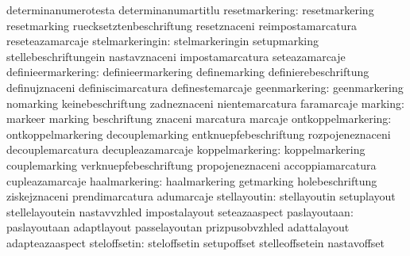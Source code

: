                                   determinanumerotesta             determinanumartitlu
                  resetmarkering: resetmarkering                   resetmarking
                                  ruecksetztenbeschriftung         resetznaceni
                                  reimpostamarcatura               reseteazamarcaje
                 stelmarkeringin: stelmarkeringin                  setupmarking
                                  stellebeschriftungein            nastavznaceni
                                  impostamarcatura                 seteazamarcaje
              definieermarkering: definieermarkering               definemarking
                                  definierebeschriftung            definujznaceni
                                  definiscimarcatura               definestemarcaje
                   geenmarkering: geenmarkering                    nomarking
                                  keinebeschriftung                zadneznaceni
                                  nientemarcatura                  faramarcaje
                         marking: markeer                          marking
                                  beschriftung                     znaceni
                                  marcatura                        marcaje
              ontkoppelmarkering: ontkoppelmarkering               decouplemarking
                                  entknuepfebeschriftung           rozpojeneznaceni
                                  decouplemarcatura                decupleazamarcaje %
                 koppelmarkering: koppelmarkering                  couplemarking
                                  verknuepfebeschriftung           propojeneznaceni
                                  accoppiamarcatura                cupleazamarcaje %
                   haalmarkering: haalmarkering                    getmarking
                                  holebeschriftung                 ziskejznaceni
                                  prendimarcatura                  adumarcaje %
                    stellayoutin: stellayoutin                     setuplayout
                                  stellelayoutein                  nastavvzhled
                                  impostalayout                    seteazaaspect
                    paslayoutaan: paslayoutaan                     adaptlayout
                                  passelayoutan                    prizpusobvzhled
                                  adattalayout                     adapteazaaspect
                    steloffsetin: steloffsetin                     setupoffset
                                  stelleoffsetein                  nastavoffset
